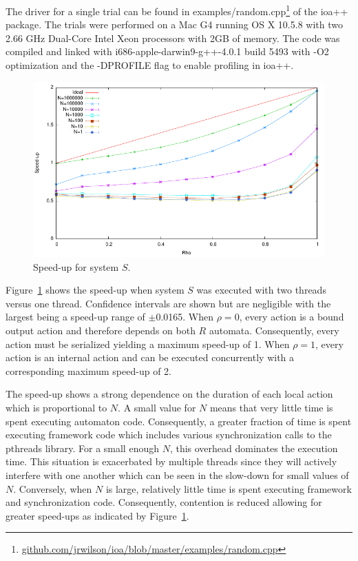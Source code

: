 The driver for a single trial can be found in examples/random.cpp\footnote{\url{github.com/jrwilson/ioa/blob/master/examples/random.cpp}} of the ioa++ package.
The trials were performed on a Mac G4 running OS X 10.5.8 with two 2.66 GHz Dual-Core Intel Xeon processors with 2GB of memory.
The code was compiled and linked with i686-apple-darwin9-g++-4.0.1 build 5493 with -O2 optimization and the -DPROFILE flag to enable profiling in ioa++.

\begin{figure}
\center
\includegraphics[width=\columnwidth]{speed_up}
\caption{Speed-up for system $S$.\label{speed_up}}
\end{figure}

Figure~\ref{speed_up} shows the speed-up when system $S$ was executed with two threads versus one thread.
Confidence intervals are shown but are negligible with the largest being a speed-up range of $\pm$0.0165.
When $\rho = 0$, every action is a bound output action and therefore depends on both $R$ automata.
Consequently, every action must be serialized yielding a maximum speed-up of 1.
When $\rho = 1$, every action is an internal action and can be executed concurrently with a corresponding maximum speed-up of 2.

The speed-up shows a strong dependence on the duration of each local action which is proportional to $N$.
A small value for $N$ means that very little time is spent executing automaton code.
Consequently, a greater fraction of time is spent executing framework code which includes various synchronization calls to the pthreads library.
For a small enough $N$, this overhead dominates the execution time.
This situation is exacerbated by multiple threads since they will actively interfere with one another which can be seen in the slow-down for small values of $N$.
Conversely, when $N$ is large, relatively little time is spent executing framework and synchronization code.
Consequently, contention is reduced allowing for greater speed-ups as indicated by Figure~\ref{speed_up}.

